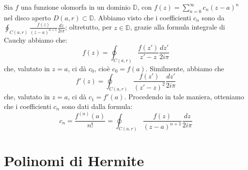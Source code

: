 Sia $f$ una funzione olomorfa in un dominio $\mathbb{D}$, con $f(z)=\sum_{n=0} ^{\infty} c_n (z-a)^n$ nel disco aperto $D(a,r) \subset \mathbb{D}$. Abbiamo visto che i coefficienti $c_n$ sono da $\oint_{C(a,r)} \frac{f(z)}{(z-a)^{n+1}} \frac{dz}{2 i \pi}$; oltretutto, per $z \in \mathbb{D}$, grazie alla formula integrale di Cauchy abbiamo che:
$$f(z)=\oint_{C(a,r)} \frac{f(z')}{z'-z} \frac{dz'}{2 i \pi}$$
che, valutato in $z=a$, ci dà $c_0$, cioè $c_0=f(a)$. 
\clearpage
Similmente, abbiamo che
$$f'(z)=\oint_{C(a,r)} \frac{f(z')}{(z'-z)^2} \frac{dz'}{2 i \pi}$$
che, valutato in $z=a$, ci dà $c_1=f'(a)$. Procedendo in tale maniera, otteniamo che i coefficienti $c_n$ sono dati dalla formula:
$$c_n=\frac{f^{(n)}(a)}{n!}=\oint_{C(a,r)} \frac{f(z)}{(z-a)^{n+1}} \frac{dz}{2 i \pi}$$

\section{Polinomi di Hermite}

